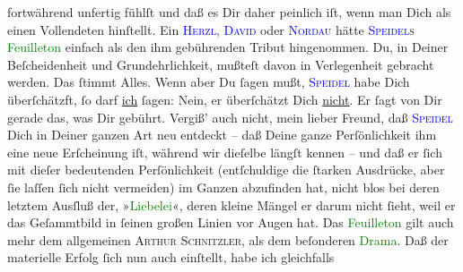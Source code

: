                fortwährend unfertig {\pb}fühlſt und daß es Dir daher
               peinlich iſt, wenn man Dich als einen \strikeout{\textcolor{gray}{V}} Vollendeten hinſtellt. Ein \textsc{\textcolor{blue}{Herzl}{}\ledrightnote{\textcolor{blue}{Theodor Herzl}}}, \textsc{\textcolor{blue}{David}{}\ledrightnote{\textcolor{blue}{Jakob Julius David}}} oder \textsc{\textcolor{blue}{Nordau}{}\ledrightnote{\textcolor{blue}{Max Nordau}}} hätte \textsc{\textcolor{blue}{Speidel}{}\ledrightnote{\textcolor{blue}{Ludwig Speidel}}s}{ }\textcolor{green}{Feuilleton}{} einfach als den ihm
               gebührenden Tribut hingenommen. Du, in Deiner Beſcheidenheit und Grundehrlichkeit,
               mußteſt davon in Verlegenheit gebracht werden. Das ſtimmt Alles. Wenn aber Du ſagen
               mußt, \textsc{\textcolor{blue}{Speidel}{}\ledrightnote{\textcolor{blue}{Ludwig Speidel}}} habe  Dich überſchätzft, ſo darf \uline{ich} ſagen: Nein, er überſchätzt Dich \uline{nicht}. \strikeout{\textcolor{gray}{V}}{ }\strikeout{\textcolor{gray}{Verge}} Er ſagt von Dir gerade das, was Dir gebührt. Vergiß’ auch {\pb}nicht, mein lieber Freund, daß \textsc{\textcolor{blue}{Speidel}{}\ledrightnote{\textcolor{blue}{Ludwig Speidel}}} Dich in Deiner ganzen Art neu entdeckt – daß Deine ganze Perſönlichkeit ihm
               eine neue Erſcheinung iſt, \strikeout{\textcolor{gray}{×}} während wir dieſelbe längſt kennen – und daß er ſich mit dieſer bedeutenden
               Perſönlichkeit (entſchuldige die ſtarken Ausdrücke, aber ſie laſſen ſich nicht
               vermeiden)  im Ganzen abzufinden hat, nicht blos bei deren letztem Ausſluß der, »\textcolor{green}{Liebelei}{}\ledrightnote{\textcolor{green}{Liebelei. Schauspiel in drei Akten}}«, deren kleine Mängel {\pb}er darum nicht ſieht, weil er das Geſammtbild in
               ſeinen großen Linien vor Augen hat. Das \textcolor{green}{Feuilleton}{} gilt auch mehr dem allgemeinen \textsc{Arthur Schnitzler}, als dem beſonderen \textcolor{green}{Drama}{}.\pend
           \pstart
           Daß der materielle Erfolg ſich nun auch einſtellt, habe ich gleichfalls
